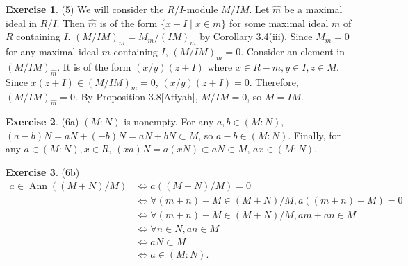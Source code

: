 \documentclass[12pt, psamsfonts]{amsart}
\theoremstyle{definition}
\newtheorem*{exer}{Exercise}
\theoremstyle{remark}
\DeclareMathOperator{\Ann}{Ann}
\numberwithin{equation}{section}
\begin{document}
\begin{exer}{(5)}
  We will consider the $R / I$-module $M / IM$.
  Let $\hat{m}$ be a maximal ideal in $R / I$.
  Then $\hat{m}$ is of the form $\{ x + I \mid x \in m \}$ for some maximal ideal $m$ of $R$ containing $I$.
  $(M / IM)_{m} = M_m / (IM)_m$ by Corollary 3.4(iii).
  Since $M_m = 0$ for any maximal ideal $m$ containing $I$, $(M / IM)_{m} = 0$.
  Consider an element in $(M / IM)_{\hat{m}}$.
  It is of the form $(x / y)(z + I)$ where $x \in R - m, y \in I, z \in M$.
  Since $x(z + I) \in (M / IM)_{m} = 0$, $(x / y)(z + I) = 0$.
  Therefore, $(M / IM)_{\hat{m}} = 0$.
  By Proposition 3.8[Atiyah], $M / IM = 0$, so $M = IM$.
\end{exer}

\begin{exer}{(6a)}
  $(M:N)$ is nonempty.
  For any $a, b \in (M:N)$, $(a - b)N = aN + (-b)N = aN + bN \subset M$, so $a - b \in (M:N)$.
  Finally, for any $a \in (M:N), x \in R$, $(xa)N = a(xN) \subset aN \subset M$, $ax \in (M:N)$.
\end{exer}

\begin{exer}{(6b)}
  $ $
  \begin{align*}
    a \in \Ann((M + N) / M)
      &\iff a((M + N) / M) = 0 \\
      &\iff \forall (m + n) + M \in (M + N) / M, a((m + n) + M) = 0 \\
      &\iff \forall (m + n) + M \in (M + N) / M, am + an \in M \\
      &\iff \forall n \in N, an \in M \\
      &\iff aN \subset M \\
      &\iff a \in (M:N).
  \end{align*}
\end{exer}
\end{document}

